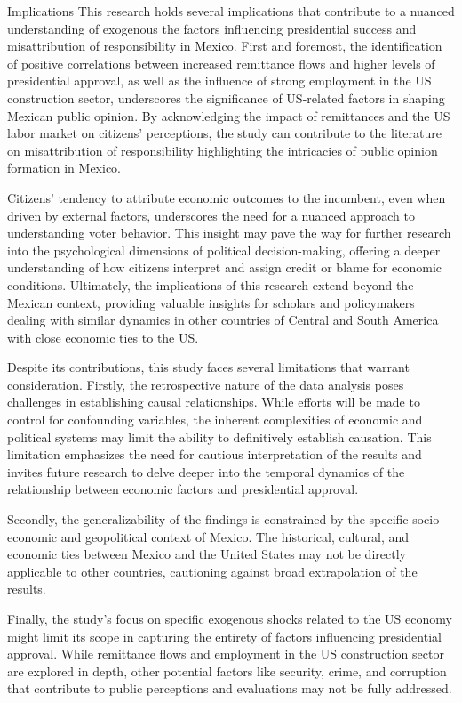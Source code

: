 \documentclass[
]{article}
\begin{document}
Implications This research holds several implications that contribute to
a nuanced understanding of exogenous the factors influencing
presidential success and misattribution of responsibility in Mexico.
First and foremost, the identification of positive correlations between
increased remittance flows and higher levels of presidential approval,
as well as the influence of strong employment in the US construction
sector, underscores the significance of US-related factors in shaping
Mexican public opinion. By acknowledging the impact of remittances and
the US labor market on citizens' perceptions, the study can contribute
to the literature on misattribution of responsibility highlighting the
intricacies of public opinion formation in Mexico.

Citizens' tendency to attribute economic outcomes to the incumbent, even
when driven by external factors, underscores the need for a nuanced
approach to understanding voter behavior. This insight may pave the way
for further research into the psychological dimensions of political
decision-making, offering a deeper understanding of how citizens
interpret and assign credit or blame for economic conditions.
Ultimately, the implications of this research extend beyond the Mexican
context, providing valuable insights for scholars and policymakers
dealing with similar dynamics in other countries of Central and South
America with close economic ties to the US.

Despite its contributions, this study faces several limitations that
warrant consideration. Firstly, the retrospective nature of the data
analysis poses challenges in establishing causal relationships. While
efforts will be made to control for confounding variables, the inherent
complexities of economic and political systems may limit the ability to
definitively establish causation. This limitation emphasizes the need
for cautious interpretation of the results and invites future research
to delve deeper into the temporal dynamics of the relationship between
economic factors and presidential approval.

Secondly, the generalizability of the findings is constrained by the
specific socio-economic and geopolitical context of Mexico. The
historical, cultural, and economic ties between Mexico and the United
States may not be directly applicable to other countries, cautioning
against broad extrapolation of the results.

Finally, the study's focus on specific exogenous shocks related to the
US economy might limit its scope in capturing the entirety of factors
influencing presidential approval. While remittance flows and employment
in the US construction sector are explored in depth, other potential
factors like security, crime, and corruption that contribute to public
perceptions and evaluations may not be fully addressed.
\end{document}
